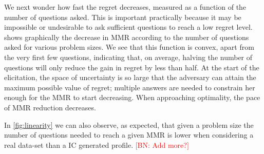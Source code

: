 \documentclass{article}
\newcommand{\commentBN}[1]{\textcolor{red}{\small$\big[$BN: #1$\big]$}}
\begin{document}
We next wonder how fast the regret decreases, measured as a function of the number of questions asked. This is important practically because it may be impossible or undesirable to ask sufficient questions to reach a low regret level.
 shows graphically the decrease in MMR according to the number of questions asked for various problem sizes. We see that this function is convex, apart from the very first few questions, indicating %
that, on average, halving the number of questions will only reduce the gain in regret by less than half. %
At the start of the elicitation, the space of uncertainty is so large that the adversary can attain the maximum possible value of regret; multiple answers are needed to constrain her enough for the MMR to start decreasing. When approaching optimality, the pace of MMR reduction decreases.

In \cref{fig:linearity} we can also observe, as expected, that given a problem size the number of questions needed to reach a given MMR is lower when considering a real data-set than a IC generated profile. \commentBN{Add more?}

\end{document}
